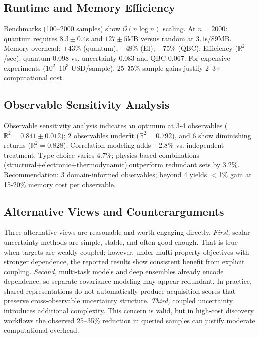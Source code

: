 \documentclass[conference]{IEEEtran}
\begin{document}
\subsection{Runtime and Memory Efficiency}
Benchmarks (100--2000 samples) show $\mathcal{O}(n \log n)$ scaling. At $n=2000$: quantum requires $8.3\pm0.4$s and $127\pm5$MB versus random at $3.1$s/$89$MB. Memory overhead: +43\% (quantum), +48\% (EI), +75\% (QBC). Efficiency ($\mathbb{R}^2$/sec): quantum 0.098 vs. uncertainty 0.083 and QBC 0.067. For expensive experiments ($10^2$--$10^3$ USD/sample), 25--35\% sample gains justify 2--3$\times$ computational cost.

\subsection{Observable Sensitivity Analysis}
Observable sensitivity analysis indicates an optimum at 3-4 observables ($\mathbb{R}^2=0.841\pm0.012$); 2 observables underfit ($\mathbb{R}^2=0.792$), and 6 show diminishing returns ($\mathbb{R}^2=0.828$). Correlation modeling adds +2.8\% vs. independent treatment. Type choice varies 4.7\%; physics-based combinations (structural+electronic+thermodynamic) outperform redundant sets by 3.2\%. Recommendation: 3 domain-informed observables; beyond 4 yields $<$1\% gain at 15-20\% memory cost per observable.

\subsection{Alternative Views and Counterarguments}
Three alternative views are reasonable and worth engaging directly. \textit{First,} scalar uncertainty methods are simple, stable, and often good enough. That is true when targets are weakly coupled; however, under multi-property objectives with stronger dependence, the reported results show consistent benefit from explicit coupling. \textit{Second,} multi-task models and deep ensembles already encode dependence, so separate covariance modeling may appear redundant. In practice, shared representations do not automatically produce acquisition scores that preserve cross-observable uncertainty structure. \textit{Third,} coupled uncertainty introduces additional complexity. This concern is valid, but in high-cost discovery workflows the observed 25--35\% reduction in queried samples can justify moderate computational overhead.
\end{document}
